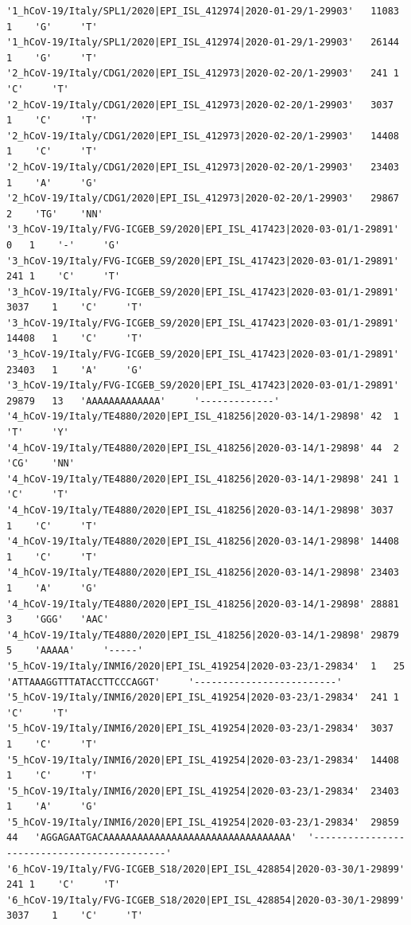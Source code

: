 \documentclass[a4paper,10pt]{article}
\begin{document}
\begin{verbatim}
'1_hCoV-19/Italy/SPL1/2020|EPI_ISL_412974|2020-01-29/1-29903'	11083	1	 'G'	 'T'
'1_hCoV-19/Italy/SPL1/2020|EPI_ISL_412974|2020-01-29/1-29903'	26144	1	 'G'	 'T'
'2_hCoV-19/Italy/CDG1/2020|EPI_ISL_412973|2020-02-20/1-29903'	241	1	 'C'	 'T'
'2_hCoV-19/Italy/CDG1/2020|EPI_ISL_412973|2020-02-20/1-29903'	3037	1	 'C'	 'T'
'2_hCoV-19/Italy/CDG1/2020|EPI_ISL_412973|2020-02-20/1-29903'	14408	1	 'C'	 'T'
'2_hCoV-19/Italy/CDG1/2020|EPI_ISL_412973|2020-02-20/1-29903'	23403	1	 'A'	 'G'
'2_hCoV-19/Italy/CDG1/2020|EPI_ISL_412973|2020-02-20/1-29903'	29867	2	 'TG'	 'NN'
'3_hCoV-19/Italy/FVG-ICGEB_S9/2020|EPI_ISL_417423|2020-03-01/1-29891'	0	1	 '-'	 'G'
'3_hCoV-19/Italy/FVG-ICGEB_S9/2020|EPI_ISL_417423|2020-03-01/1-29891'	241	1	 'C'	 'T'
'3_hCoV-19/Italy/FVG-ICGEB_S9/2020|EPI_ISL_417423|2020-03-01/1-29891'	3037	1	 'C'	 'T'
'3_hCoV-19/Italy/FVG-ICGEB_S9/2020|EPI_ISL_417423|2020-03-01/1-29891'	14408	1	 'C'	 'T'
'3_hCoV-19/Italy/FVG-ICGEB_S9/2020|EPI_ISL_417423|2020-03-01/1-29891'	23403	1	 'A'	 'G'
'3_hCoV-19/Italy/FVG-ICGEB_S9/2020|EPI_ISL_417423|2020-03-01/1-29891'	29879	13	 'AAAAAAAAAAAAA'	 '-------------'
'4_hCoV-19/Italy/TE4880/2020|EPI_ISL_418256|2020-03-14/1-29898'	42	1	 'T'	 'Y'
'4_hCoV-19/Italy/TE4880/2020|EPI_ISL_418256|2020-03-14/1-29898'	44	2	 'CG'	 'NN'
'4_hCoV-19/Italy/TE4880/2020|EPI_ISL_418256|2020-03-14/1-29898'	241	1	 'C'	 'T'
'4_hCoV-19/Italy/TE4880/2020|EPI_ISL_418256|2020-03-14/1-29898'	3037	1	 'C'	 'T'
'4_hCoV-19/Italy/TE4880/2020|EPI_ISL_418256|2020-03-14/1-29898'	14408	1	 'C'	 'T'
'4_hCoV-19/Italy/TE4880/2020|EPI_ISL_418256|2020-03-14/1-29898'	23403	1	 'A'	 'G'
'4_hCoV-19/Italy/TE4880/2020|EPI_ISL_418256|2020-03-14/1-29898'	28881	3	 'GGG'	 'AAC'
'4_hCoV-19/Italy/TE4880/2020|EPI_ISL_418256|2020-03-14/1-29898'	29879	5	 'AAAAA'	 '-----'
'5_hCoV-19/Italy/INMI6/2020|EPI_ISL_419254|2020-03-23/1-29834'	1	25	 'ATTAAAGGTTTATACCTTCCCAGGT'	 '-------------------------'
'5_hCoV-19/Italy/INMI6/2020|EPI_ISL_419254|2020-03-23/1-29834'	241	1	 'C'	 'T'
'5_hCoV-19/Italy/INMI6/2020|EPI_ISL_419254|2020-03-23/1-29834'	3037	1	 'C'	 'T'
'5_hCoV-19/Italy/INMI6/2020|EPI_ISL_419254|2020-03-23/1-29834'	14408	1	 'C'	 'T'
'5_hCoV-19/Italy/INMI6/2020|EPI_ISL_419254|2020-03-23/1-29834'	23403	1	 'A'	 'G'
'5_hCoV-19/Italy/INMI6/2020|EPI_ISL_419254|2020-03-23/1-29834'	29859	44	 'AGGAGAATGACAAAAAAAAAAAAAAAAAAAAAAAAAAAAAAAAA'	 '--------------------------------------------'
'6_hCoV-19/Italy/FVG-ICGEB_S18/2020|EPI_ISL_428854|2020-03-30/1-29899'	241	1	 'C'	 'T'
'6_hCoV-19/Italy/FVG-ICGEB_S18/2020|EPI_ISL_428854|2020-03-30/1-29899'	3037	1	 'C'	 'T'

\end{verbatim}
\end{document}
